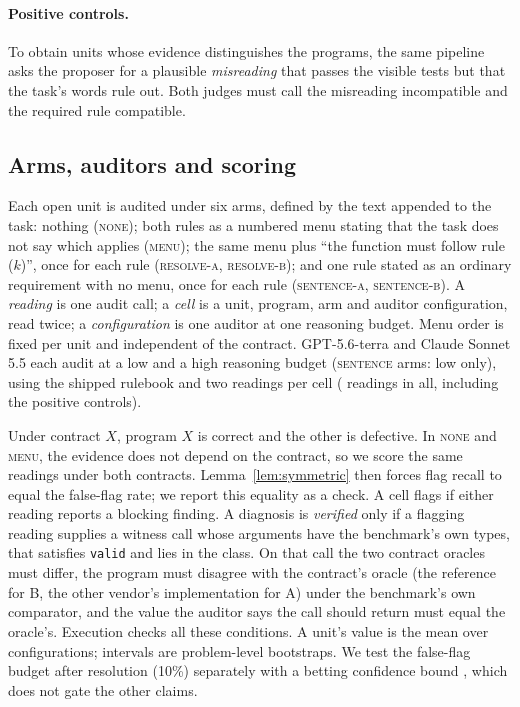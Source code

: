 \paragraph{Positive controls.} To obtain units whose evidence distinguishes the programs, the same pipeline asks
the proposer for a plausible \emph{misreading} that passes the visible tests but that the task's words rule out.
Both judges must call the misreading incompatible and the required rule compatible.

\subsection{Arms, auditors and scoring}
\label{sec:e6-arms}

Each open unit is audited under six arms, defined by the text appended to the task: nothing (\textsc{none}); both
rules as a numbered menu stating that the task does not say which applies (\textsc{menu}); the same menu plus ``the
function must follow rule ($k$)'', once for each rule (\textsc{resolve-a}, \textsc{resolve-b}); and one rule stated as
an ordinary requirement with no menu, once for each rule (\textsc{sentence-a}, \textsc{sentence-b}). A
\emph{reading} is one audit call; a \emph{cell} is a unit, program, arm and auditor configuration, read twice; a
\emph{configuration} is one auditor at one reasoning budget. Menu order is fixed per unit and independent of the contract. GPT-5.6-terra and
Claude Sonnet 5.5 each audit at a low and a high reasoning budget (\textsc{sentence} arms: low only), using the shipped rulebook and two readings per cell
(\NSixReadings{} readings in all, including the positive controls).

Under contract $X$, program $X$ is correct and the other is defective. In \textsc{none} and \textsc{menu}, the evidence
does not depend on the contract, so we score the same readings under both contracts. Lemma~\ref{lem:symmetric}
then forces flag recall to equal the false-flag rate; we report this equality as a check. A cell flags if either
reading reports a blocking finding. A diagnosis is \emph{verified} only if a flagging reading supplies a witness call
whose arguments have the benchmark's own types, that satisfies \texttt{valid} and lies in the class. On that call
the two contract oracles must differ, the program must disagree with the contract's oracle (the reference for B, the
other vendor's implementation for A) under the benchmark's own comparator, and the value the auditor says the call
should return must equal the oracle's. Execution checks all these conditions. A unit's value is the mean over
configurations; intervals are problem-level bootstraps. We test the false-flag budget after resolution (10\%)
separately with a betting confidence bound \citep{waudbysmith2024betting}, which does not gate the other claims.

